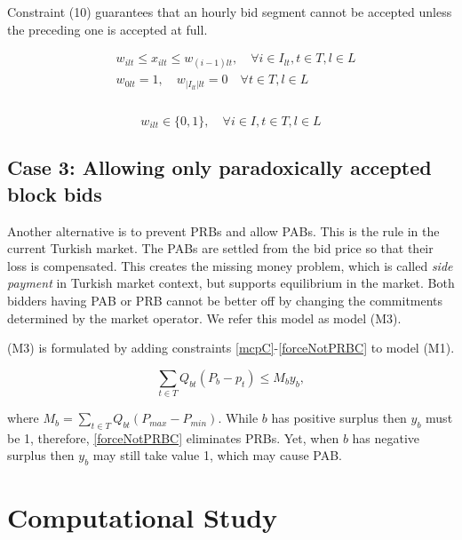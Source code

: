 \documentclass[conference]{IEEEtran}
\begin{document}
Constraint (10) guarantees that an hourly bid segment cannot be accepted unless the preceding one is accepted at full.

\begin{equation}
    \label{continuityC}
    \begin{split}
         & w_{ilt} \leq x_{ilt} \leq w_{(i-1)lt},\quad \forall i\in I_{lt}, t \in T,  l\in L  \\
         & w_{0lt} = 1, \quad w_{|I_{lt}|lt} = 0 \quad \forall t \in T,  l\in L  \\ \\    
     \end{split}
\end{equation}

\begin{equation}
    \label{variables2C}
   w_{ilt} \in \{0,1\}, \quad\forall i \in I,  t\in T , l\in L
\end{equation}


\subsection{Case 3: Allowing only paradoxically accepted block bids }
Another alternative is to prevent PRBs and allow PABs. This is the rule in the current Turkish market. The PABs are settled from the bid price so that their loss is compensated. This creates the missing money problem, which is called \textit{side payment} in Turkish market context, but supports equilibrium in the market. Both bidders having PAB or PRB cannot be better off by changing the commitments determined by the market operator. We refer this model as model (M3).

(M3) is formulated by adding constraints \eqref{mcpC}-\eqref{forceNotPRBC} to model (M1).

\begin{equation}
    \label{forceNotPRBC}
   \sum_{t\in T} Q_{bt} (P_b-p_t) \leq M_b y_b,
\end{equation}

where $M_b= \sum_{t\in T} Q_{bt} (P_{max}-P_{min})$. While $b$ has positive surplus then $y_b$ must be 1, therefore, \eqref{forceNotPRBC} eliminates PRBs. Yet, when $b$ has negative surplus then $y_b$ may still take value 1, which may cause PAB. 

\section{Computational Study}
\label{cs}
\end{document}
